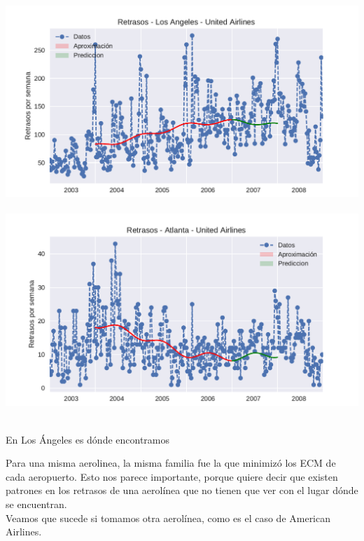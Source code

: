 {\centering
  \includegraphics[width=1.0\linewidth]{informe/imagenes/retrasosUnitedAirlinesLAvol2.pdf}
}
$ $\newline
{\centering
  \includegraphics[width=1.0\linewidth]{informe/imagenes/retrasosUnitedAirlinesATLvol2.pdf}
}
$ $\newline

En Los Ángeles es dónde encontramos 

Para una misma aerolinea, la misma familia fue la que minimizó los ECM de cada aeropuerto. Esto nos parece importante, porque quiere decir que existen patrones en los retrasos de una aerolínea que no tienen que ver con el lugar dónde se encuentran. \\

Veamos que sucede si tomamos otra aerolínea, como es el caso de American Airlines. 


